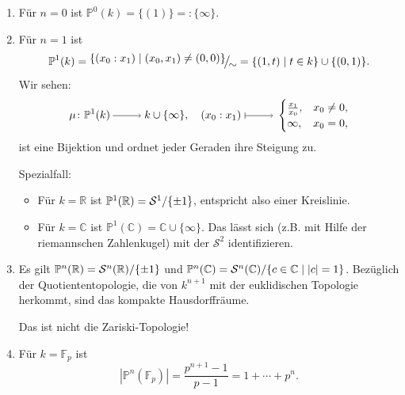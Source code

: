 \documentclass[a4paper,12pt]{scrbook}
\theoremstyle{keinenummern} %
\theoremstyle{mitnummern}
\theoremstyle{unserbeweis}
\def\C{\mathbb{C}}
\def\P{\mathbb{P}}
\def\S{\mathcal{S}}
\newcommand{\FF}{\mathbb{F}}
\newcommand{\card}[1]{|#1|}
\newcommand{\set}[1]{\ensuremath{\mathbb{#1}}}
\newcommand{\R}{\set{R}}
\newcommand{\ra}{\raisebox{-1pt}{\tikz{\draw[thin,shorten >=3pt, ->] (0,0) node{\hspace*{-2pt}} -- node{} (1,0);}}\penalty1000\relax}
\renewcommand{\mapsto}{\raisebox{-1pt}{\tikz{\draw[thin,shorten >=3pt, |->] (0,0) node{\hspace*{0pt}} -- node{} (1,0);}}\penalty1000\relax}
\newcommand{\Quotient}[2]{
  \mathchoice
  { %
    \raisebox{0.7ex}{\ensuremath{#1}}
    \ensuremath{\mkern-3mu}\big/\ensuremath{\mkern-3mu}
    \raisebox{-0.6ex}{\ensuremath{#2}}
  }
  { %
    #1/#2
  }
  { %
    #1/#2
  }
  { %
    #1/#2
  }
}
\begin{document}
\begin{bsp}\label{2.2.2}\begin{enumerate}
\item Für $n=0$ ist $\P^{0}(k) = \{(1)\} =: \{\infty\}$.
\item Für $n=1$ ist \[\P^{1}(k)=\Quotient{\{(x_{0}:x_{1})\mid(x_{0},x_{1})\neq(0,0)\}}{\sim}=\{(1,t)\mid t\in k\}\cup\{(0,1)\}.\] \vspace*{-6pt}Wir sehen:\vspace*{-12pt}
\[\mu\colon\P^{1}(k)\ra k\cup\{\infty\},\quad(x_{0}:x_{1})\mapsto\begin{cases}\frac{x_{1}}{x_{0}},&x_{0}\neq0,\\\infty,&x_{0}=0,\\\end{cases}\]
ist eine Bijektion und ordnet jeder Geraden ihre Steigung zu.

{\sc Spezialfall:}\begin{itemize}\item Für $k=\R$ ist $\P^{1}(\R)=\Quotient{\S^{1}}{\{\pm1\}}$, entspricht also einer Kreislinie.
\item Für $k=\C$ ist $\P^{1}(\C)=\C\cup\{\infty\}$. Das lässt sich (z.B. mit Hilfe der riemannschen Zahlenkugel) mit der $\S^{2}$ identifizieren.
\end{itemize}
\item Es gilt $\P^{n}(\R)=\Quotient{\S^{n}(\R)}{\{\pm1\}}$ und $\P^{n}(\C)=\Quotient{\S^{n}(\C)}{\{c\in\C\mid |c|=1\}}$. Bezüglich der Quotiententopologie, die von $k^{n+1}$ mit der euklidischen Topologie herkommt, sind das kompakte Hausdorffräume.
\begin{w}Das ist nicht die Zariski-Topologie!\end{w}
\item Für $k=\FF_{p}$ ist
\[\card{\P^{n}(\FF_{p})}=\frac{p^{n+1}-1}{p-1}=1+\dotsm+p^{n}.\]
\end{enumerate}\end{bsp}
\end{document}
